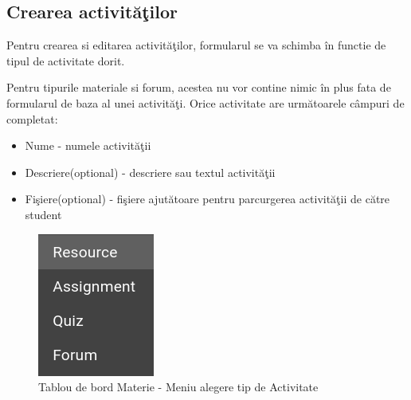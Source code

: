 \documentclass[12pt, a4paper, oneside, romanian]{teza-upb}
\begin{document}
\subsection{Crearea activităţilor}

Pentru crearea si editarea activităţilor, formularul se va schimba în functie de tipul de activitate dorit.

Pentru tipurile materiale si forum, acestea nu vor contine nimic în plus fata de formularul de baza al unei activităţi. Orice activitate are următoarele câmpuri de completat:
\begin{itemize}
	\item Nume - numele activităţii
	\item Descriere(optional) - descriere sau textul activităţii
	\item Fişiere(optional) - fişiere ajutătoare pentru parcurgerea activităţii de către student
\end{itemize}

\begin{figure}[H]
\centering
\includegraphics*[width=0.2\columnwidth]{tablou-de-bord-materie-meniu-alegere-tip-de-activitate}
\caption{Tablou de bord Materie - Meniu alegere tip de Activitate}
\label{tablou-de-bord-materie-meniu-alegere-tip-de-activitate}
\end{figure}
\end{document}
